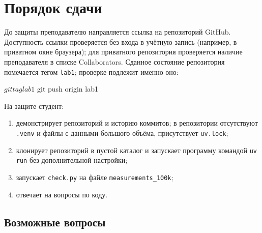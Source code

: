 \documentclass[11pt,a4paper]{article}
\newcommand{\code}[1]{\texttt{#1}}
\begin{document}
\section{Порядок сдачи}

До защиты преподавателю направляется ссылка на репозиторий GitHub. Доступность ссылки
проверяется без входа в учётную запись (например, в приватном окне браузера); для приватного
репозитория проверяется наличие преподавателя в списке Collaborators. Сданное состояние
репозитория помечается тегом \code{lab1}; проверке подлежит именно оно:
\begin{shell}
$ git tag lab1
$ git push origin lab1
\end{shell}

На защите студент:
\begin{enumerate}
  \item демонстрирует репозиторий и историю коммитов; в репозитории отсутствуют \code{.venv}
        и файлы с данными большого объёма, присутствует \code{uv.lock};
  \item клонирует репозиторий в пустой каталог и запускает программу командой \code{uv run}
        без дополнительной настройки;
  \item запускает \code{check.py} на файле \code{measurements\_100k};
  \item отвечает на вопросы по коду.
\end{enumerate}

\subsection*{Возможные вопросы}
\end{document}
